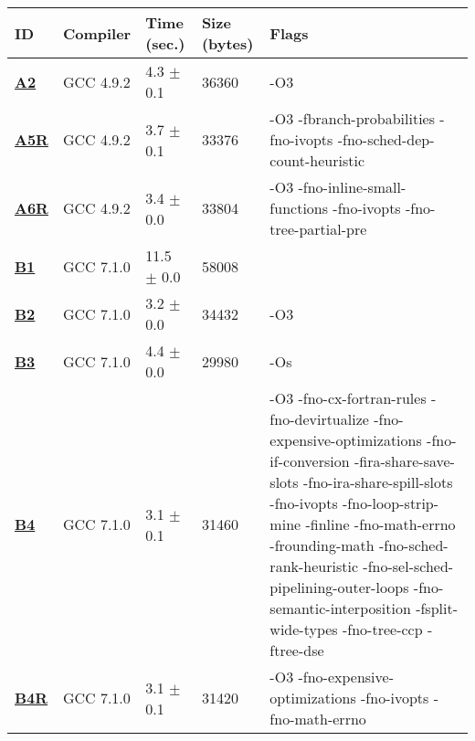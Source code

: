     \begin{tabular}{|l|l|l|l|p{3.2in}|}
     \hline
      \textbf{ID} & \textbf{Compiler} & \textbf{Time (sec.)} & \textbf{Size (bytes)} & \textbf{Flags} \\ 
     \hline
      \textbf{ \href{http://cknowledge.org/repo/web.php?wcid=experiment:0b867dd820354a8b\&subpoint=5734f47e4214a783}{A2} } &  GCC 4.9.2  &  4.3 $\pm$ 0.1  &  36360  & {\small -O3 }\\
     \hline
      \textbf{ \href{http://cknowledge.org/repo/web.php?wcid=experiment:984b2d8abc3c4415\&subpoint=78c281b4cab897a6}{A5R} } &  GCC 4.9.2  &  3.7 $\pm$ 0.1  &  33376  & {\small -O3 -fbranch-probabilities -fno-ivopts -fno-sched-dep-count-heuristic }\\
     \hline
      \textbf{ \href{http://cknowledge.org/repo/web.php?wcid=experiment:7af17ca204080b57\&subpoint=5a464ecf81b60098}{A6R} } &  GCC 4.9.2  &  3.4 $\pm$ 0.0  &  33804  & {\small -O3 -fno-inline-small-functions -fno-ivopts -fno-tree-partial-pre }\\
     \hline
      \textbf{ \href{http://cknowledge.org/repo/web.php?wcid=experiment:ea8ded6ddee6093a\&subpoint=6006d3eadf403088}{B1} } &  GCC 7.1.0  &  11.5 $\pm$ 0.0  &  58008  & {\small  }\\
     \hline
      \textbf{ \href{http://cknowledge.org/repo/web.php?wcid=experiment:00fa4e108053ac7b\&subpoint=de68bdc517447085}{B2} } &  GCC 7.1.0  &  3.2 $\pm$ 0.0  &  34432  & {\small -O3 }\\
     \hline
      \textbf{ \href{http://cknowledge.org/repo/web.php?wcid=experiment:eeba1f30493b8bd4\&subpoint=5d64cf89c67817be}{B3} } &  GCC 7.1.0  &  4.4 $\pm$ 0.0  &  29980  & {\small -Os }\\
     \hline
      \textbf{ \href{http://cknowledge.org/repo/web.php?wcid=experiment:f4f13d284194463a\&subpoint=5421ba4fdca2c4b6}{B4} } &  GCC 7.1.0  &  3.1 $\pm$ 0.1  &  31460  & {\small -O3 -fno-cx-fortran-rules -fno-devirtualize -fno-expensive-optimizations -fno-if-conversion -fira-share-save-slots -fno-ira-share-spill-slots -fno-ivopts -fno-loop-strip-mine -finline -fno-math-errno -frounding-math -fno-sched-rank-heuristic -fno-sel-sched-pipelining-outer-loops -fno-semantic-interposition -fsplit-wide-types -fno-tree-ccp -ftree-dse }\\
     \hline
      \textbf{ \href{http://cknowledge.org/repo/web.php?wcid=experiment:2b6646924c79bf81\&subpoint=e8a36aa042438771}{B4R} } &  GCC 7.1.0  &  3.1 $\pm$ 0.1  &  31420  & {\small -O3 -fno-expensive-optimizations -fno-ivopts -fno-math-errno }\\
     \hline
    \end{tabular}    